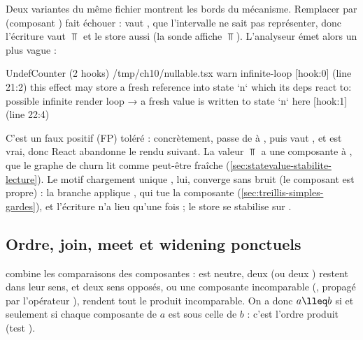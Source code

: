 Deux variantes du même fichier montrent les bords du mécanisme. Remplacer
 par  (composant
) fait échouer  : 
vaut , que l'intervalle ne sait pas représenter, donc l'écriture
vaut $\Top$ et le store aussi (la sonde affiche  $\Top$). L'analyseur
émet alors un \Warning{} plus vague :
\begin{sortie}
  UndefCounter  (2 hooks)  /tmp/ch10/nullable.tsx
    warn   infinite-loop  [hook:0]  (line 21:2)  this effect may store a fresh reference into state `n` which its deps react to: possible infinite render loop
       → a fresh value is written to state `n` here [hook:1] (line 22:4)
\end{sortie}
C'est un faux positif (FP) toléré : concrètement,  passe de
 à , puis  vaut , et
 est vrai, donc React abandonne le rendu suivant.
La valeur $\Top$ a une composante  à , que le
graphe de churn lit comme \og peut-être fraîche\fg{}
(\cref{sec:statevalue-stabilite-lecture}). Le motif \og chargement
unique\fg{} , lui, converge
sans bruit (le composant  est propre) : la branche
 applique , qui tue la composante
 (\cref{sec:treillis-simples-gardes}), et l'écriture n'a
lieu qu'une fois ; le store se stabilise sur .

\subsection{Ordre, join, meet et widening ponctuels}


 combine les comparaisons des composantes :  est
neutre, deux  (ou deux ) restent dans leur sens,
et deux sens opposés, ou une composante incomparable (, propagé
par l'opérateur ), rendent tout le produit incomparable. On a donc
$a \lleq b$ si et seulement si chaque composante de $a$ est sous celle de
$b$ : c'est l'ordre produit (test ).


